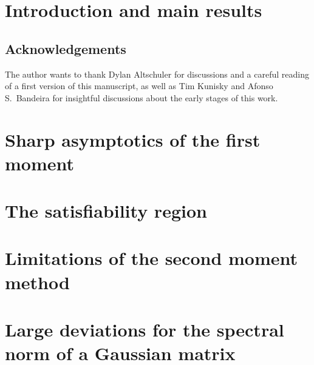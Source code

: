 \documentclass[a4paper,11pt]{article}
\begin{document}
\setcounter{tocdepth}{2}
\tableofcontents

\section{Introduction and main results}\label{sec:intro}


\subsection*{Acknowledgements}
The author wants to thank Dylan Altschuler for discussions and a careful reading of a first version of this manuscript, 
as well as Tim Kunisky and Afonso S.\ Bandeira for insightful discussions about the early stages of this work.

\section{Sharp asymptotics of the first moment}\label{sec:1st_moment}


\section{The satisfiability region}\label{sec:2nd_moment}


\section{Limitations of the second moment method}\label{sec:fail_2nd_moment}


\appendix 
\section{Large deviations for the spectral norm of a Gaussian matrix}\label{sec:appendix_ldp}


\printbibliography
\end{document}
